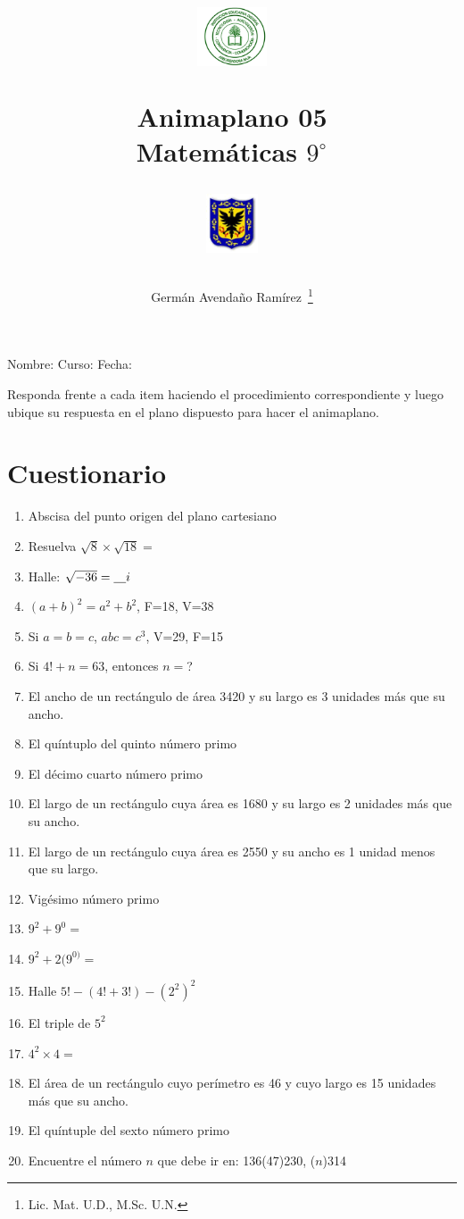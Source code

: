 \documentclass[letterpaper,11pt,twoside]{article}
\author{Germ\'an Avenda\~no Ram\'irez~\thanks{Lic. Mat. U.D., M.Sc. U.N.}}
\title{\begin{minipage}{.2\textwidth}
\includegraphics[height=1.75cm]{Images/logo-colegio.png}\end{minipage}
\begin{minipage}{.55\textwidth}
\begin{center}
Animaplano 05\\
Matemáticas $9^{\circ}$
\end{center}
\end{minipage}\hfill
\begin{minipage}{.2\textwidth}
\includegraphics[height=1.75cm]{Images/logo-sed.png} 
\end{minipage}}
\date{}
\begin{document}
\maketitle
Nombre: \hrulefill Curso: \underline{\hspace*{44pt}} Fecha: \underline{\hspace*{2.5cm}}
\begin{multicols}{2}
Responda frente a cada item haciendo el procedimiento correspondiente y luego ubique su respuesta en el plano dispuesto para hacer el animaplano.
\section*{Cuestionario}
 \begin{enumerate}
 \item Abscisa del punto origen del plano cartesiano
 \item Resuelva $\sqrt{8}\times \sqrt{18}=$
 \item Halle: $\sqrt{-36}=\underline{\hspace*{10pt}}i$
 \item $(a+b)^{2}=a^{2}+b^{2}$, \qquad F=18, \; V=38
 \item Si $a=b=c$, $abc=c^{3}$, \qquad V=29, \; F=15
 \item Si $4!+n=63$, entonces $n=$?
 \item El ancho de un rectángulo de área 3420 y su largo es 3 unidades más que su ancho.
 \item El quíntuplo del quinto número primo
 \item El décimo cuarto número primo
 \item El largo de un rectángulo cuya área es 1680 y su largo es 2 unidades más que su ancho.
 \item El largo de un rectángulo cuya área es 2550 y su ancho es 1 unidad menos que su largo.
 \item Vigésimo número primo
 \item $9^{2}+9^{0}=$
 \item $9^{2}+2(9^{0)}=$
 \item Halle $5!-(4!+3!)-(2^{2})^{2}$
 \item El triple de $5^{2}$
 \item $4^{2}\times 4=$
 \item El área de un rectángulo cuyo perímetro es 46 y cuyo largo es 15 unidades más que su ancho.
 \item El quíntuple del sexto número primo
 \item Encuentre el número $n$ que debe ir en: 136(47)230, ($n$)314

\end{enumerate}
\end{multicols}
\end{document}

